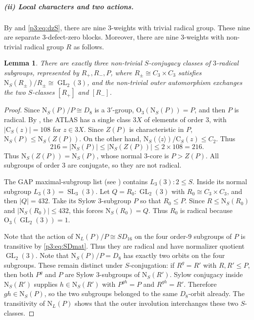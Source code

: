 \documentclass[11pt,a4paper]{article}
\numberwithin{equation}{section}
\newtheorem{lemma}[theorem]{Lemma}
\theoremstyle{definition}
\theoremstyle{remark}
\newcommand{\GL}{\operatorname{GL}}
\newcommand{\SL}{\operatorname{SL}}
\newcommand{\Nor}{\mathrm{N}}
\newcommand{\Cen}{\mathrm{C}}
\newcommand{\OO}{\mathrm{O}}
\newcommand{\NN}{\mathrm N}
\newcommand{\CC}{\mathrm C}
\begin{document}
\subparagraph{(ii) Local characters and two actions.} By \cite[Theorem 5.1 and its proof]{Malle} and \eqref{p3:eq:dzS}, there are nine  $3$-weights with trivial radical group. These nine are separate $3$-defect-zero blocks.
Moreover, there are nine $3$-weights with non-trivial radical group $R$ as follows.
\begin{lemma}\label{p3:prop:radical}
There are exactly three non-trivial \(S\)-conjugacy classes of \(3\)-radical subgroups, represented by $R_+, R_-, P$, where \(R_\pm\cong C_3\times C_3\) satisfies
 $\NN_S(R_\pm)/R_\pm\cong\GL_2(3)$, and the non-trivial outer automorphism exchanges the two \(S\)-classes \([R_+]\) and \([R_-]\).
\end{lemma}
\begin{proof}
Since \(\NN_S(P)/P\cong D_8\) is a \(3'\)-group, \(\OO_3(\NN_S(P))=P\), and then $P$ is radical.
By \cite{A}, the ATLAS has a single class \(3X\) of elements of order \(3\), with \(|\CC_S(z)|=108\) for \(z\in3X\).
Since \(Z(P)\) is characteristic in \(P\),
\(\NN_S(P)\leq\NN_S(Z(P))\).  On the other hand,
\(\Nor_S(\langle z\rangle)/\Cen_S(z)\leq C_2\). Thus
\[
 216=|\NN_S(P)|\leq|\NN_S(Z(P))|\leq2\times108=216.
\]
Thus \(\NN_S(Z(P))=\NN_S(P)\), whose normal \(3\)-core is \(P>Z(P)\). All subgroups of order \(3\) are conjugate, so they are not radical.

The GAP maximal-subgroup list (see \cite{T}) contains \(L_3(3):2\leq S\). Inside its normal subgroup \(L_3(3)=\SL_3(3)\). Let \(Q=R_0:\GL_2(3)\) with \(R_0\cong C_3\times C_3\), and then \(|Q|=432\).  Take its Sylow \(3\)-subgroup \(P\) so that \(R_0\leq P\).  Since \(R\leq\NN_S(R_0)\) and  $|\NN_S(R_0)|\leq 432$, this forces
\(\NN_S(R_0)=Q\).  Thus \(R_0\) is radical because
\(\OO_3(\GL_2(3))=1\).

Note that the action of \(\NN_L(P)/P\cong SD_{16}\) on the four order-\(9\) subgroups of \(P\) is transitive by \eqref{p3:eq:SDmat}.  Thus they
are radical and have normalizer quotient \(\GL_2(3)\).
Note that \(\NN_S(P)/P=D_8\) has exactly two orbits on
the four subgroups.  These remain distinct under \(S\)-conjugation: if \(R^g=R'\) with \(R,R'\leq P\), then both \(P^g\) and \(P\) are Sylow \(3\)-subgroups of \(\NN_S(R')\).  Sylow conjugacy inside \(\NN_S(R')\) supplies \(h\in\NN_S(R')\) with \(P^{gh}=P\) and \(R^{gh}=R'\).  Therefore \(gh\in\NN_S(P)\), so the two subgroups belonged to the same \(D_8\)-orbit already. The transitivity of \(\NN_L(P)\) shows that the outer involution interchanges these two \(S\)-classes.
\end{proof}
\end{document}
